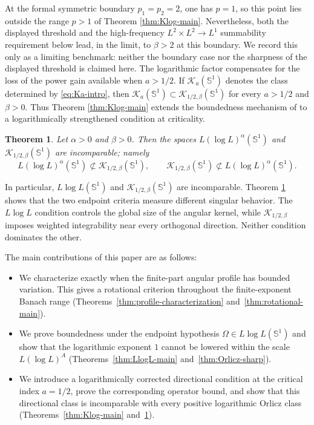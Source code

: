 \documentclass[11pt]{amsart}
\newtheorem{theorem}[definition]{Theorem}
\theoremstyle{remark}
\numberwithin{equation}{section}
\newcommand{\Sph}{\mathbb S^1}
\newcommand{\cK}{\mathcal K}
\begin{document}
	At the formal symmetric boundary \(p_1=p_2=2\), one has \(p=1\), so this
	point lies outside the range \(p>1\) of Theorem \ref{thm:Klog-main}.
	Nevertheless, both the displayed threshold and the high-frequency
	\(L^2\times L^2\to L^1\) summability requirement below lead, in the limit, to
	\(\beta>2\) at this boundary.  We record this only as a limiting benchmark:
	neither the boundary case nor the sharpness of the displayed threshold is
	claimed here.  The logarithmic factor compensates for the loss of the power
	gain available when \(a>1/2\).  If
	\(\cK_a(\Sph)\) denotes the class determined by \eqref{eq:Ka-intro}, then
	\(\cK_a(\Sph)\subset\cK_{1/2,\beta}(\Sph)\) for every \(a>1/2\) and
	\(\beta>0\).  Thus Theorem \ref{thm:Klog-main} extends the boundedness mechanism
	of \cite{DQX0404} to a logarithmically strengthened condition at criticality.
	
	\begin{theorem}\label{thm:incomparability}
		Let \(\alpha>0\) and \(\beta>0\). Then the spaces
		$L(\log L)^\alpha(\Sph)$ and $\cK_{1/2,\beta}(\Sph)$
		are incomparable; namely
		\[
		L(\log L)^\alpha(\Sph)\not\subset\cK_{1/2,\beta}(\Sph),
		\qquad
		\cK_{1/2,\beta}(\Sph)\not\subset L(\log L)^\alpha(\Sph).
		\]
	
	\end{theorem}
	
		In particular, \(L\log L(\Sph)\) and
	\(\cK_{1/2,\beta}(\Sph)\) are  incomparable. Theorem \ref{thm:incomparability} shows that the two endpoint criteria measure
	different singular behavior.  The \(L\log L\) condition controls the global
	size of the angular kernel, while \(\cK_{1/2,\beta}\) imposes weighted
	integrability near every orthogonal direction.  Neither condition dominates the
	other.
	
	The main contributions of this paper are as follows:
	\begin{itemize}
		\item We characterize exactly when the finite-part angular profile has
		bounded variation.  This gives a rotational criterion throughout the
		finite-exponent Banach range
		(Theorems~\ref{thm:profile-characterization}
		and~\ref{thm:rotational-main}).
		
		\item We prove boundedness under the endpoint hypothesis
		\(\Omega\in L\log L(\Sph)\) and show that the logarithmic exponent \(1\)
		cannot be lowered within the scale \(L(\log L)^A\)
		(Theorems~\ref{thm:LlogL-main} and~\ref{thm:Orlicz-sharp}).
		
		\item We introduce a logarithmically corrected directional condition at the
		critical index \(a=1/2\), prove the corresponding operator bound, and show
		that this directional class is incomparable with every positive logarithmic
		Orlicz class
		(Theorems~\ref{thm:Klog-main} and~\ref{thm:incomparability}).
	\end{itemize}
	
\end{document}
